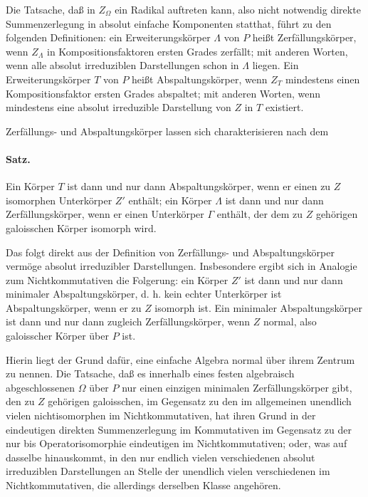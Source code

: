 \documentclass[11pt]{article}
\begin{document}
Die Tatsache, daß in \(Z_\Omega\) ein Radikal auftreten kann, also nicht notwendig direkte Summenzerlegung in absolut einfache Komponenten statthat, führt zu den folgenden Definitionen: ein Erweiterungskörper \(\Lambda\) von \(P\) heißt Zerfällungskörper, wenn \(Z_\Lambda\) in Kompositionsfaktoren ersten Grades zerfällt; mit anderen Worten, wenn alle absolut irreduziblen Darstellungen schon in \(\Lambda\) liegen. Ein Erweiterungskörper \(T\) von \(P\) heißt Abspaltungskörper, wenn \(Z_T\) mindestens einen Kompositionsfaktor ersten Grades abspaltet; mit anderen Worten, wenn mindestens eine absolut irreduzible Darstellung von \(Z\) in \(T\) existiert.

Zerfällungs- und Abspaltungskörper lassen sich charakterisieren nach dem

\paragraph{Satz.}
Ein Körper \(T\) ist dann und nur dann Abspaltungskörper, wenn er einen zu \(Z\) isomorphen Unterkörper \(Z'\) enthält; ein Körper \(\Lambda\) ist dann und nur dann Zerfällungskörper, wenn er einen Unterkörper \(\Gamma\) enthält, der dem zu \(Z\) gehörigen galoisschen Körper isomorph wird.

Das folgt direkt aus der Definition von Zerfällungs- und Abspaltungskörper vermöge absolut irreduzibler Darstellungen. Insbesondere ergibt sich in Analogie zum Nichtkommutativen die Folgerung: ein Körper \(Z'\) ist dann und nur dann minimaler Abspaltungskörper, d. h. kein echter Unterkörper ist Abspaltungskörper, wenn er zu \(Z\) isomorph ist. Ein minimaler Abspaltungskörper ist dann und nur dann zugleich Zerfällungskörper, wenn \(Z\) normal, also galoisscher Körper über \(P\) ist.

Hierin liegt der Grund dafür, eine einfache Algebra normal über ihrem Zentrum zu nennen. Die Tatsache, daß es innerhalb eines festen algebraisch abgeschlossenen \(\Omega\) über \(P\) nur einen einzigen minimalen Zerfällungskörper gibt, den zu \(Z\) gehörigen galoisschen, im Gegensatz zu den im allgemeinen unendlich vielen nichtisomorphen im Nichtkommutativen, hat ihren Grund in der eindeutigen direkten Summenzerlegung im Kommutativen im Gegensatz zu der nur bis Operatorisomorphie eindeutigen im Nichtkommutativen; oder, was auf dasselbe hinauskommt, in den nur endlich vielen verschiedenen absolut irreduziblen Darstellungen an Stelle der unendlich vielen verschiedenen im Nichtkommutativen, die allerdings derselben Klasse angehören.
\end{document}
